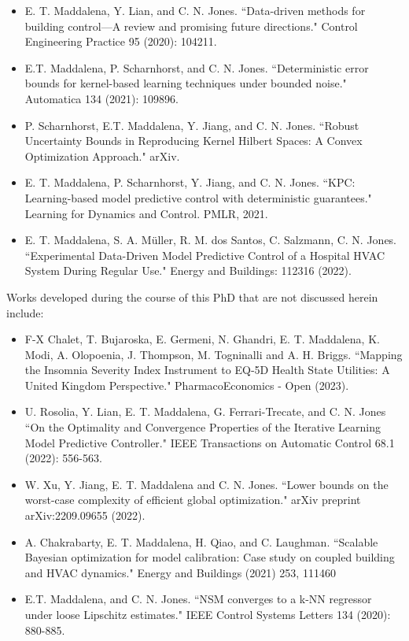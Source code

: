 \begin{itemize}
	\item E. T. Maddalena, Y. Lian, and C. N. Jones. ``Data-driven methods for building control—A review and promising future directions." Control Engineering Practice 95 (2020): 104211.
	
	\item E.T. Maddalena, P. Scharnhorst, and C. N. Jones. ``Deterministic error bounds for kernel-based learning techniques under bounded noise." Automatica 134 (2021): 109896.
	
	\item P. Scharnhorst, E.T. Maddalena, Y. Jiang, and C. N. Jones. ``Robust Uncertainty Bounds in Reproducing Kernel Hilbert Spaces: A Convex Optimization Approach." arXiv.
	
	\item E. T. Maddalena, P. Scharnhorst, Y. Jiang, and C. N. Jones. ``KPC: Learning-based model predictive control with deterministic guarantees." Learning for Dynamics and Control. PMLR, 2021.

	\item E. T. Maddalena, S. A. Müller, R. M. dos Santos, C. Salzmann, C. N. Jones. ``Experimental Data-Driven Model Predictive Control of a Hospital HVAC System During Regular Use." Energy and Buildings: 112316 (2022).
	
\end{itemize}

Works developed during the course of this PhD that are not discussed herein include:

\begin{itemize}	
	\item F-X Chalet, T. Bujaroska, E. Germeni, N. Ghandri, E. T. Maddalena, K. Modi, A. Olopoenia, J. Thompson, M. Togninalli and A. H. Briggs. ``Mapping the Insomnia Severity Index Instrument to EQ‑5D Health State Utilities: A United Kingdom Perspective." PharmacoEconomics - Open (2023).
	
	\item U. Rosolia, Y. Lian, E. T. Maddalena, G. Ferrari-Trecate, and C. N. Jones ``On the Optimality and Convergence Properties of the Iterative Learning Model Predictive Controller." IEEE Transactions on Automatic Control 68.1 (2022): 556-563.	
	
	\item W. Xu, Y. Jiang, E. T. Maddalena and C. N. Jones. ``Lower bounds on the worst-case complexity of efficient global optimization." arXiv preprint arXiv:2209.09655 (2022).
		
	\item A. Chakrabarty, E. T. Maddalena, H. Qiao, and C. Laughman. ``Scalable Bayesian optimization for model calibration: Case study on coupled building and HVAC dynamics." Energy and Buildings (2021) 253, 111460
	
	\item E.T. Maddalena, and C. N. Jones. ``NSM converges to a k-NN regressor under loose Lipschitz estimates." IEEE Control Systems Letters  134 (2020): 880-885.
		
\end{itemize}